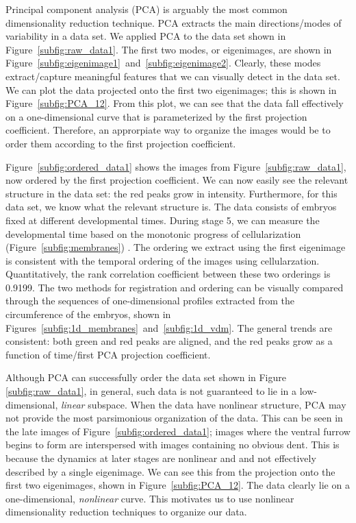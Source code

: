 \documentclass{pnastwo}
\begin{document}
\begin{article}
Principal component analysis (PCA) \cite{shlens2005tutorial} is arguably the most common dimensionality reduction technique.
%
PCA extracts the main directions/modes of variability in a data set. 
%
We applied PCA to the data set shown in Figure~\ref{subfig:raw_data1}.
%
The first two modes, or eigenimages, are shown in Figure~\ref{subfig:eigenimage1}~and~\ref{subfig:eigenimage2}.
%
Clearly, these modes extract/capture meaningful features that we can visually detect in the data set. 
%
We can plot the data projected onto the first two eigenimages; this is shown in Figure~\ref{subfig:PCA_12}.
%
From this plot, we can see that the data fall effectively on a one-dimensional curve that is parameterized by the first projection coefficient.
%
Therefore, an approrpiate way to organize the images would be to order them according to the first projection coefficient. 

Figure~\ref{subfig:ordered_data1} shows the images from Figure~\ref{subfig:raw_data1}, now ordered by the first projection coefficient.
%
We can now easily see the relevant structure in the data set:
the red peaks grow in intensity.
%
Furthermore, for this data set, we know what the relevant structure is.
%
The data consists of embryos fixed at different developmental times. 
%
During stage 5, we can measure the developmental time based on the monotonic progress of cellularization (Figure~\ref{subfig:membranes}) \cite{figard2013plasma}.%
%
The ordering we extract using the first eigenimage is consistent with the temporal ordering of the images using cellularzation.
%
Quantitatively, the rank correlation coefficient between these two orderings is 0.9199.
%
The two methods for registration and ordering can be visually compared through the sequences of one-dimensional profiles extracted from the circumference of the embryos, shown in Figures~\ref{subfig:1d_membranes}~and~\ref{subfig:1d_vdm}.
%
The general trends are consistent:
both green  and red peaks are aligned, and the red peaks grow as a function of time/first PCA projection coefficient.

Although PCA can successfully order the data set shown in Figure \ref{subfig:raw_data1}, in general, such data is not guaranteed to lie in a low-dimensional, {\it linear} subspace.
%
When the data have nonlinear structure, PCA may not provide the most parsimonious organization of the data.
%
This can be seen in the late images of Figure~\ref{subfig:ordered_data1};
images where the ventral furrow begins to form are interspersed with images containing no obvious dent.
%
This is because the dynamics at later stages are nonlinear and and not effectively described by a single eigenimage.
%
We can see this from the projection onto the first two eigenimages, shown in Figure~\ref{subfig:PCA_12}.
%
The data clearly lie on a one-dimensional, {\em nonlinear} curve.
%
This motivates us to use nonlinear dimensionality reduction techniques to organize our data.





\end{article}
\end{document}
